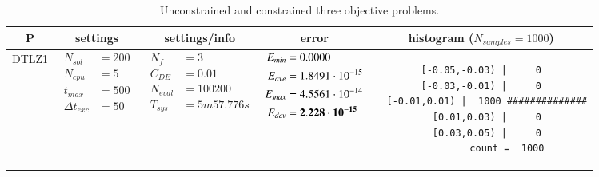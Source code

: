 
\begin{table*} [!t] \centering
\caption{Unconstrained and constrained three objective problems.}
\scriptsize  \setlength{\tabcolsep}{0.5em}

\begin{tabular}[c]{ccccc} \toprule
P & settings & settings/info & error & histogram ($N_{samples}=1000$) \\ \hline

DTLZ1
&
{$\!\begin{aligned}
    N_{sol}        &= 200 \\
	N_{cpu}        &= 5 \\
	t_{max}        &= 500 \\
	\Delta t_{exc} &= 50
\end{aligned}$}
&
{$\!\begin{aligned}
	N_{f}    &= 3 \\
	C_{DE}   &= 0.01 \\
	N_{eval} &= 100200 \\
	T_{sys}  &= 5m57.776s
\end{aligned}$}
&
{$\!\begin{aligned}
    E_{min} &= 0.0000 \\
    E_{ave} &= 1.8491\cdot 10^{-15} \\
    E_{max} &= 4.5561\cdot 10^{-14} \\
    E_{dev} &= {\bf 2.228\cdot 10^{-15}}
\end{aligned}$}
&
\begin{minipage}{4.1cm} \fontsize{5pt}{6pt}
\begin{verbatim}
 [-0.05,-0.03) |     0 
 [-0.03,-0.01) |     0 
  [-0.01,0.01) |  1000 ##############
   [0.01,0.03) |     0 
   [0.03,0.05) |     0 
         count =  1000
 \end{verbatim}
\end{minipage} \\

\hline




\end{tabular}
\end{table*}
